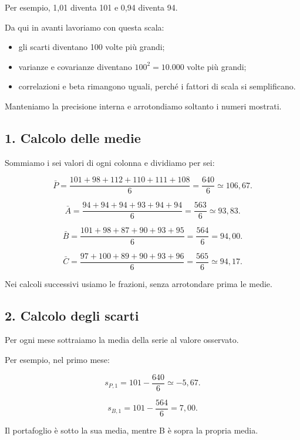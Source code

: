 \noindent Per esempio,
1,01 diventa 101
e 0,94 diventa 94.

\noindent Da qui in avanti
lavoriamo con questa scala:

\begin{itemize}
    \item gli scarti diventano 100 volte più grandi;
    \item varianze e covarianze diventano
    $100^2=10.000$ volte più grandi;
    \item correlazioni e beta rimangono uguali,
    perché i fattori di scala si semplificano.
\end{itemize}

\noindent Manteniamo la precisione interna
e arrotondiamo soltanto i numeri mostrati.


\subsection*{1. Calcolo delle medie}

\noindent Sommiamo i sei valori
di ogni colonna e dividiamo per sei:

\[
\bar P
=
\frac{101+98+112+110+111+108}{6}
=
\frac{640}{6}
\simeq
\boxed{106{,}67}.
\]

\[
\bar A
=
\frac{94+94+94+93+94+94}{6}
=
\frac{563}{6}
\simeq
\boxed{93{,}83}.
\]

\[
\bar B
=
\frac{101+98+87+90+93+95}{6}
=
\frac{564}{6}
=
\boxed{94{,}00}.
\]

\[
\bar C
=
\frac{97+100+89+90+93+96}{6}
=
\frac{565}{6}
\simeq
\boxed{94{,}17}.
\]

\noindent Nei calcoli successivi
usiamo le frazioni, senza arrotondare
prima le medie.


\subsection*{2. Calcolo degli scarti}

\noindent Per ogni mese sottraiamo
la media della serie al valore osservato.

\noindent Per esempio, nel primo mese:

\[
s_{P,1}
=
101-\frac{640}{6}
\simeq-5{,}67.
\]

\[
s_{B,1}
=
101-\frac{564}{6}
=
7{,}00.
\]

\noindent Il portafoglio è sotto la sua media,
mentre B è sopra la propria media.

